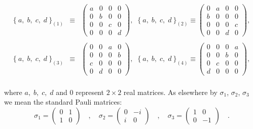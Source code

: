 \documentclass[a4paper,12pt]{book}
\begin{document}
\begin{eqnarray}
\{~a,\;b,\;c,\;d~\}_{(1)} &\equiv &\left( 
\begin{array}{cccc}
{a} & {0} & {0} & {0} \\ 
0 & b & 0 & 0 \\ 
0 & 0 & c & 0 \\ 
0 & 0 & 0 & d
\end{array}
\right) ,\;\;\{~a,\;b,\;c,\;d~\}_{(2)}\equiv \left( 
\begin{array}{cccc}
{0} & {a} & {0} & {0} \\ 
b & 0 & 0 & 0 \\ 
0 & 0 & 0 & c \\ 
0 & 0 & d & 0
\end{array}
\right) ,  \nonumber \\
&& \\
\{~a,\;b,\;c,\;d~\}_{(3)} &\equiv &\left( 
\begin{array}{cccc}
{0} & {0} & {a} & {0} \\ 
0 & 0 & 0 & b \\ 
c & 0 & 0 & 0 \\ 
0 & d & 0 & 0
\end{array}
\right) ,\;\;\{~a,\;b,\;c,\;d~\}_{(4)}\equiv \left( 
\begin{array}{cccc}
{0} & {0} & {0} & {a} \\ 
0 & 0 & b & 0 \\ 
0 & c & 0 & 0 \\ 
d & 0 & 0 & 0
\end{array}
\right) ,  \nonumber \\
&&
\end{eqnarray}

where $a,\;b,\;c,\;d$ and $0$ represent $2\times 2$ real matrices. As
elsewhere by $\sigma _{1}$, $\sigma _{2}$, $\sigma _{3}$ we mean the
standard Pauli matrices: 
\begin{equation}
\sigma _{1}=\left( 
\begin{array}{cc}
{0} & {1} \\ 
{1} & {0}
\end{array}
\right) \quad ,\quad \sigma _{2}=\left( 
\begin{array}{cc}
{0} & {-i} \\ 
{i} & {0}
\end{array}
\right) \quad ,\quad \sigma _{3}=\left( 
\begin{array}{cc}
{1} & {0} \\ 
{0} & {-1}
\end{array}
\right) \quad .
\end{equation}
\end{document}
